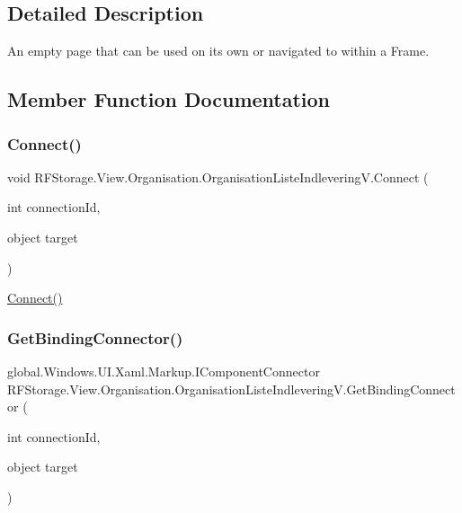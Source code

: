 \subsection{Detailed Description}
An empty page that can be used on its own or navigated to within a Frame. 



\subsection{Member Function Documentation}
\mbox{\label{class_r_f_storage_1_1_view_1_1_organisation_1_1_organisation_liste_indlevering_v_ac4d954f6250768b4512f772b956a6525}} 
\subsubsection{\texorpdfstring{Connect()}{Connect()}}
{\footnotesize\ttfamily void R\+F\+Storage.\+View.\+Organisation.\+Organisation\+Liste\+Indlevering\+V.\+Connect (\begin{DoxyParamCaption}\item[{int}]{connection\+Id,  }\item[{object}]{target }\end{DoxyParamCaption})}



\mbox{\hyperlink{class_r_f_storage_1_1_view_1_1_organisation_1_1_organisation_liste_indlevering_v_ac4d954f6250768b4512f772b956a6525}{Connect()}} 

\mbox{\label{class_r_f_storage_1_1_view_1_1_organisation_1_1_organisation_liste_indlevering_v_aa490d82055f8158eeaac5ae55e04f6ba}} 
\subsubsection{\texorpdfstring{GetBindingConnector()}{GetBindingConnector()}}
{\footnotesize\ttfamily global.\+Windows.\+U\+I.\+Xaml.\+Markup.\+I\+Component\+Connector R\+F\+Storage.\+View.\+Organisation.\+Organisation\+Liste\+Indlevering\+V.\+Get\+Binding\+Connector (\begin{DoxyParamCaption}\item[{int}]{connection\+Id,  }\item[{object}]{target }\end{DoxyParamCaption})}



